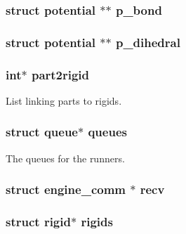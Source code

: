 \hypertarget{structengine_a15640f6c6966c68953b63d33dea07554}{
\subsubsection[{p\-\_\-bond}]{\setlength{\rightskip}{0pt plus 5cm}struct {\bf potential} $\ast$$\ast$ p\-\_\-bond}}\label{structengine_a15640f6c6966c68953b63d33dea07554}
\hypertarget{structengine_a517a9f921afc4c34b7466a96ad8dcd08}{
\subsubsection[{p\-\_\-dihedral}]{\setlength{\rightskip}{0pt plus 5cm}struct {\bf potential} $\ast$$\ast$ p\-\_\-dihedral}}\label{structengine_a517a9f921afc4c34b7466a96ad8dcd08}
\hypertarget{structengine_a448d9f7a86161fe9934ccb854577b2ba}{
\subsubsection[{part2rigid}]{\setlength{\rightskip}{0pt plus 5cm}int$\ast$ part2rigid}}\label{structengine_a448d9f7a86161fe9934ccb854577b2ba}
List linking parts to rigids. \hypertarget{structengine_a46d7feb8d0f2e0c63a8931e32457d9b9}{
\subsubsection[{queues}]{\setlength{\rightskip}{0pt plus 5cm}struct {\bf queue}$\ast$ queues}}\label{structengine_a46d7feb8d0f2e0c63a8931e32457d9b9}
The queues for the runners. \hypertarget{structengine_a2dd27e1a884588070ecd396f05178efc}{
\subsubsection[{recv}]{\setlength{\rightskip}{0pt plus 5cm}struct {\bf engine\-\_\-comm} $\ast$ recv}}\label{structengine_a2dd27e1a884588070ecd396f05178efc}
\hypertarget{structengine_aaaf93c1958292b3b5c88b6ac34495aad}{
\subsubsection[{rigids}]{\setlength{\rightskip}{0pt plus 5cm}struct {\bf rigid}$\ast$ rigids}}\label{structengine_aaaf93c1958292b3b5c88b6ac34495aad}
